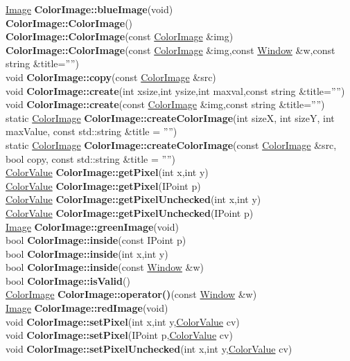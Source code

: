 \documentclass[10pt,titlepage]{article}
\def\functionlistentry#1#2#3#4#5#6{\noindent #1 {\bf #2}(#3) \dotfill #6\\}
\def\letterref#1{}
\def\letterlabelend#1{}
\begin{document}
{{\letterref{Ca}
\letterref{Ce}
\letterref{Ch}
\letterref{Ci}
\letterref{Cl}
\letterref{Co}
\letterref{Cr}
\letterref{Cu}
\letterlabelend{Co}
\functionlistentry{\hyperlink{Image}{Image}}{ColorImage::blueImage}{void}{29}{Images}{}
\functionlistentry{}{ColorImage::ColorImage}{}{15}{Images}{}
\functionlistentry{}{ColorImage::ColorImage}{const \hyperlink{ColorImage}{ColorImage} \&img}{16}{Images}{}
\functionlistentry{}{ColorImage::ColorImage}{const \hyperlink{ColorImage}{ColorImage} \&img,const \hyperlink{Window}{Window} \&w,const string \&title=''''}{32}{Images}{}
\functionlistentry{void}{ColorImage::copy}{const \hyperlink{ColorImage}{ColorImage} \&src}{19}{Images}{}
\functionlistentry{void}{ColorImage::create}{int xsize,int ysize,int maxval,const string \&title=''''}{17}{Images}{}
\functionlistentry{void}{ColorImage::create}{const \hyperlink{ColorImage}{ColorImage} \&img,const string \&title=''''}{18}{Images}{}
\functionlistentry{static \hyperlink{ColorImage}{ColorImage}}{ColorImage::createColorImage}{int sizeX, int sizeY, int maxValue, const std::string \&title = ''''}{20}{Images}{}
\functionlistentry{static \hyperlink{ColorImage}{ColorImage}}{ColorImage::createColorImage}{const \hyperlink{ColorImage}{ColorImage} \&src, bool copy, const std::string \&title = ''''}{21}{Images}{}
\functionlistentry{\hyperlink{ColorValue}{ColorValue}}{ColorImage::getPixel}{int x,int y}{36}{Images}{}
\functionlistentry{\hyperlink{ColorValue}{ColorValue}}{ColorImage::getPixel}{IPoint p}{37}{Images}{}
\functionlistentry{\hyperlink{ColorValue}{ColorValue}}{ColorImage::getPixelUnchecked}{int x,int y}{40}{Images}{}
\functionlistentry{\hyperlink{ColorValue}{ColorValue}}{ColorImage::getPixelUnchecked}{IPoint p}{41}{Images}{}
\functionlistentry{\hyperlink{Image}{Image}}{ColorImage::greenImage}{void}{28}{Images}{}
\functionlistentry{bool}{ColorImage::inside}{const IPoint p}{61}{Images}{}
\functionlistentry{bool}{ColorImage::inside}{int x,int y}{62}{Images}{}
\functionlistentry{bool}{ColorImage::inside}{const \hyperlink{Window}{Window} \&w}{63}{Images}{}
\functionlistentry{bool}{ColorImage::isValid}{}{25}{Images}{}
\functionlistentry{\hyperlink{ColorImage}{ColorImage}}{ColorImage::operator()}{const \hyperlink{Window}{Window} \&w}{33}{Images}{}
\functionlistentry{\hyperlink{Image}{Image}}{ColorImage::redImage}{void}{27}{Images}{}
\functionlistentry{void}{ColorImage::setPixel}{int x,int y,\hyperlink{ColorValue}{ColorValue} cv}{48}{Images}{}
\functionlistentry{void}{ColorImage::setPixel}{IPoint p,\hyperlink{ColorValue}{ColorValue} cv}{49}{Images}{}
\functionlistentry{void}{ColorImage::setPixelUnchecked}{int x,int y,\hyperlink{ColorValue}{ColorValue} cv}{52}{Images}{}
}}
\end{document}
